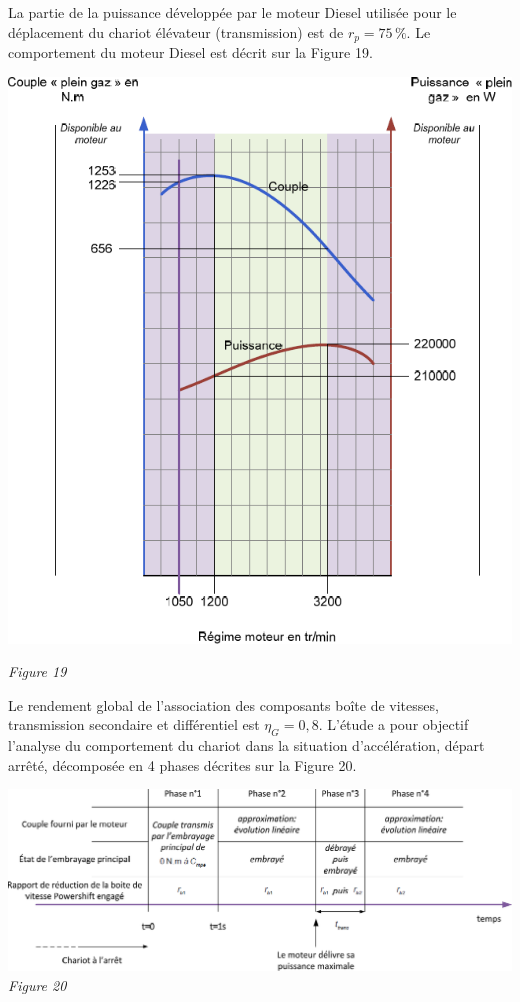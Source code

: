 \documentclass[10pt,fleqn]{article} %
\begin{document}
La partie de la puissance développée par le moteur Diesel utilisée pour le déplacement du chariot élévateur (transmission) est de $r_p= 75\, \%$.
Le comportement du moteur Diesel est décrit sur la Figure 19.




\begin{center}
\includegraphics[width=.7\linewidth]{images/fig_19}

\textit{Figure 19}
\end{center}

Le rendement global de l’association des composants boîte de vitesses, transmission secondaire et différentiel est $\eta_G=0,8$.
L’étude a pour objectif l’analyse du comportement du chariot dans la situation d’accélération, départ arrêté, décomposée en 4 phases décrites sur la Figure 20.

\begin{center}
\includegraphics[width=1.\linewidth]{images/fig_20}
\textit{Figure 20}
\end{center}
\end{document}
